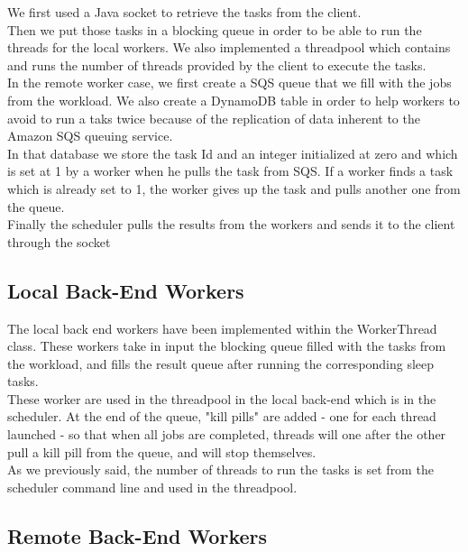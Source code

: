 \documentclass{article}
\begin{document}
We first used a Java socket to retrieve the tasks from the client. \\

Then we put those tasks in a blocking queue in order to be able to run the threads for the local workers. We also implemented a threadpool which contains and runs the number of threads provided by the client to execute the tasks.\\

In the remote worker case, we first create a SQS queue that we fill with the jobs from the workload. We also create a DynamoDB table in order to help workers to avoid to run a taks twice because of the replication of data inherent to the Amazon SQS queuing service.\\

In that database we store the task Id and an integer initialized at zero and which is set at 1 by a worker when he pulls the task from SQS. If a worker finds a task which is already set to 1, the worker gives up the task and pulls another one from the queue.\\

Finally the scheduler pulls the results from the workers and sends it to the client through the socket

\subsection{Local Back-End Workers}
The local back end workers have been implemented within the WorkerThread class. These workers take in input the blocking queue filled with the tasks from the workload, and fills the result queue after running the corresponding sleep tasks.\\ 

These worker are used in the threadpool in the local back-end which is in the scheduler. At the end of the queue, "kill pills" are added - one for each thread launched - so that when all jobs are completed, threads will one after the other pull a kill pill from the queue, and will stop themselves.\\

As we previously said, the number of threads to run the tasks is set from the scheduler command line and used in the threadpool.

\subsection{Remote Back-End Workers}
\end{document}

